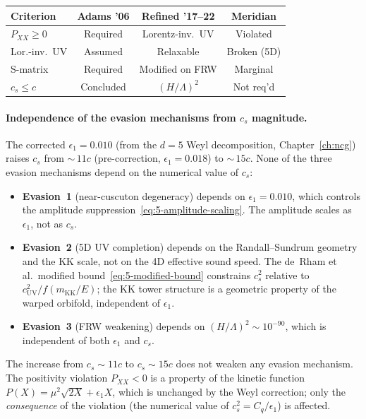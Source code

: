 \begin{center}
\footnotesize
\begin{tabular}{l c c c}
\toprule
Criterion & Adams '06 & Refined '17--22 & Meridian \\
\midrule
$P_{XX} \geq 0$ & Required & Lorentz-inv.\ UV & Violated \\
Lor.-inv.\ UV & Assumed & Relaxable & Broken (5D) \\
S-matrix & Required & Modified on FRW & Marginal \\
$c_s \leq c$ & Concluded & $(H/\Lambda)^2$ & Not req'd \\
\bottomrule
\end{tabular}
\end{center}

\paragraph{Independence of the evasion mechanisms from $c_s$ magnitude.} The corrected $\epsilon_1 = 0.010$ (from the $d = 5$ Weyl decomposition, Chapter~\ref{ch:ncg}) raises $c_s$ from ${\sim}\,11c$ (pre-correction, $\epsilon_1 = 0.018$) to ${\sim}\,15c$. None of the three evasion mechanisms depend on the numerical value of $c_s$:
\begin{itemize}
  \item \textbf{Evasion~1} (near-cuscuton degeneracy) depends on $\epsilon_1 = 0.010$, which controls the amplitude suppression~\eqref{eq:5-amplitude-scaling}. The amplitude scales as $\epsilon_1$, not as $c_s$.
  \item \textbf{Evasion~2} (5D UV completion) depends on the Randall--Sundrum geometry and the KK scale, not on the 4D effective sound speed. The de~Rham et al.\ modified bound~\eqref{eq:5-modified-bound} constrains $c_s^2$ relative to $c_\mathrm{UV}^2/f(m_\mathrm{KK}/E)$; the KK tower structure is a geometric property of the warped orbifold, independent of $\epsilon_1$.
  \item \textbf{Evasion~3} (FRW weakening) depends on $(H/\Lambda)^2 \sim 10^{-90}$, which is independent of both $\epsilon_1$ and $c_s$.
\end{itemize}
The increase from $c_s \sim 11c$ to $c_s \sim 15c$ does not weaken any evasion mechanism. The positivity violation $P_{XX} < 0$ is a property of the kinetic function $P(X) = \mu^2\sqrt{2X} + \epsilon_1 X$, which is unchanged by the Weyl correction; only the \emph{consequence} of the violation (the numerical value of $c_s^2 = C_q/\epsilon_1$) is affected.

